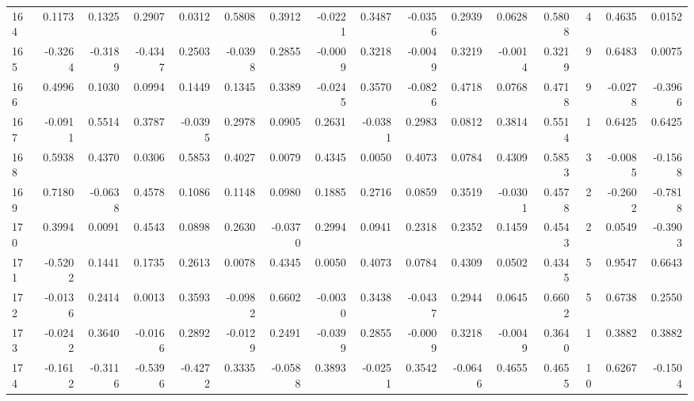 \begin{tabular}{lrrrrrrrrrrrrrrr}
164 &      0.1173 &  0.1325 &  0.2907 &  0.0312 &  0.5808 &  0.3912 & -0.0221 &  0.3487 & -0.0356 &  0.2939 &   0.0628 &     0.5808 &      4 &                    0.4635 &                     0.0152 \\
165 &     -0.3264 & -0.3189 & -0.4347 &  0.2503 & -0.0398 &  0.2855 & -0.0009 &  0.3218 & -0.0049 &  0.3219 &  -0.0014 &     0.3219 &      9 &                    0.6483 &                     0.0075 \\
166 &      0.4996 &  0.1030 &  0.0994 &  0.1449 &  0.1345 &  0.3389 & -0.0245 &  0.3570 & -0.0826 &  0.4718 &   0.0768 &     0.4718 &      9 &                   -0.0278 &                    -0.3966 \\
167 &     -0.0911 &  0.5514 &  0.3787 & -0.0395 &  0.2978 &  0.0905 &  0.2631 & -0.0381 &  0.2983 &  0.0812 &   0.3814 &     0.5514 &      1 &                    0.6425 &                     0.6425 \\
168 &      0.5938 &  0.4370 &  0.0306 &  0.5853 &  0.4027 &  0.0079 &  0.4345 &  0.0050 &  0.4073 &  0.0784 &   0.4309 &     0.5853 &      3 &                   -0.0085 &                    -0.1568 \\
169 &      0.7180 & -0.0638 &  0.4578 &  0.1086 &  0.1148 &  0.0980 &  0.1885 &  0.2716 &  0.0859 &  0.3519 &  -0.0301 &     0.4578 &      2 &                   -0.2602 &                    -0.7818 \\
170 &      0.3994 &  0.0091 &  0.4543 &  0.0898 &  0.2630 & -0.0370 &  0.2994 &  0.0941 &  0.2318 &  0.2352 &   0.1459 &     0.4543 &      2 &                    0.0549 &                    -0.3903 \\
171 &     -0.5202 &  0.1441 &  0.1735 &  0.2613 &  0.0078 &  0.4345 &  0.0050 &  0.4073 &  0.0784 &  0.4309 &   0.0502 &     0.4345 &      5 &                    0.9547 &                     0.6643 \\
172 &     -0.0136 &  0.2414 &  0.0013 &  0.3593 & -0.0982 &  0.6602 & -0.0030 &  0.3438 & -0.0437 &  0.2944 &   0.0645 &     0.6602 &      5 &                    0.6738 &                     0.2550 \\
173 &     -0.0242 &  0.3640 & -0.0166 &  0.2892 & -0.0129 &  0.2491 & -0.0399 &  0.2855 & -0.0009 &  0.3218 &  -0.0049 &     0.3640 &      1 &                    0.3882 &                     0.3882 \\
174 &     -0.1612 & -0.3116 & -0.5396 & -0.4272 &  0.3335 & -0.0588 &  0.3893 & -0.0251 &  0.3542 & -0.0646 &   0.4655 &     0.4655 &     10 &                    0.6267 &                    -0.1504 \\

\end{tabular}
